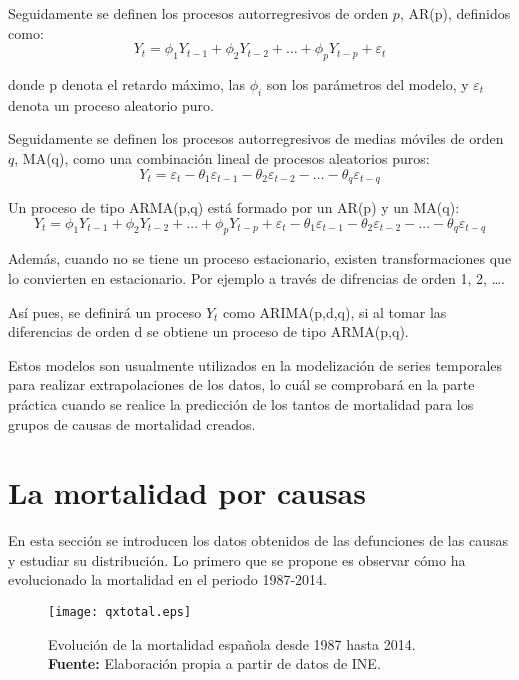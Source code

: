 \documentclass{article}
\begin{document}
Seguidamente se definen los procesos autorregresivos de orden $p$, AR(p), definidos como:
$$
Y_{t}=\phi_{1}Y_{t-1}+\phi_{2}Y_{t-2}+\dots+\phi_{p}Y_{t-p}+\varepsilon_{t}
$$

donde p denota el retardo máximo, las $\phi_{i}$ son los parámetros del modelo, y $\varepsilon_{t}$ denota un proceso aleatorio puro.

\vspace{0.3cm}

Seguidamente se definen los procesos autorregresivos de medias móviles de orden $q$, MA(q), como una combinación lineal de procesos aleatorios puros:
$$
Y_{t}=\varepsilon_{t}-\theta_{1}\varepsilon_{t-1}-\theta_{2}\varepsilon_{t-2}-\dots-\theta_{q}\varepsilon_{t-q}
$$

\vspace{0.3cm}

Un proceso de tipo ARMA(p,q) está formado por un AR(p) y un MA(q):
$$
Y_{t}=\phi_{1}Y_{t-1}+\phi_{2}Y_{t-2}+\dots+\phi_{p}Y_{t-p}+\varepsilon_{t}-\theta_{1}\varepsilon_{t-1}-\theta_{2}\varepsilon_{t-2}-\dots-\theta_{q}\varepsilon_{t-q}
$$

Además, cuando no se tiene un proceso estacionario, existen transformaciones que lo convierten en estacionario. Por ejemplo a través de difrencias de orden 1, 2, \dots .
\vspace{0.3cm}

Así pues, se definirá un proceso $Y_{t}$ como ARIMA(p,d,q), si al tomar las diferencias de orden d se obtiene un proceso de tipo ARMA(p,q). 

Estos modelos son usualmente utilizados en la modelización de series temporales para realizar extrapolaciones de los datos, lo cuál se comprobará en la parte práctica cuando se realice la predicción de los tantos de mortalidad para los grupos de causas de mortalidad creados.

\newpage
\section{La mortalidad por causas}

En esta sección se introducen los datos obtenidos de las defunciones de las causas y estudiar su distribución. Lo primero que se propone es observar cómo ha evolucionado la mortalidad en el periodo 1987-2014.

\begin{figure}[H]
\centering
\texttt{[image: qxtotal.eps]}
\caption{\centering Evolución de la mortalidad española desde 1987 hasta 2014. \\ \textbf{Fuente:} Elaboración propia a partir de datos de INE.}
\label{qxtot}
\end{figure}
\end{document}
